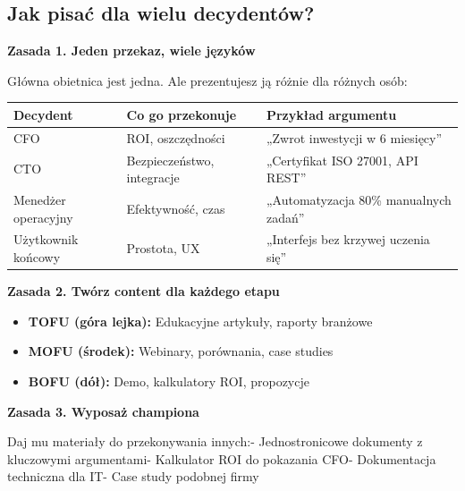 \documentclass[
  12pt,
  a4paper,
  twoside,
  openright,
  12pt,
  DIV=12,
  BCOR=12mm]{scrbook}
\providecommand{\tightlist}{%
  \setlength{\itemsep}{0pt}\setlength{\parskip}{0pt}}\usepackage{longtable,booktabs,array}
\begin{document}
\subsection{Jak pisać dla wielu
decydentów?}\label{jak-pisaux107-dla-wielu-decydentuxf3w}

\textbf{Zasada 1. Jeden przekaz, wiele języków}

Główna obietnica jest jedna. Ale prezentujesz ją różnie dla różnych
osób:

\begin{longtable}[]{@{}
  >{\raggedright\arraybackslash}p{}
  >{\raggedright\arraybackslash}p{}
  >{\raggedright\arraybackslash}p{}@{}}
\toprule\noalign{}
\begin{minipage}[b]{\linewidth}\raggedright
Decydent
\end{minipage} & \begin{minipage}[b]{\linewidth}\raggedright
Co go przekonuje
\end{minipage} & \begin{minipage}[b]{\linewidth}\raggedright
Przykład argumentu
\end{minipage} \\
\midrule\noalign{}
\endhead
\bottomrule\noalign{}
\endlastfoot
CFO & ROI, oszczędności & „Zwrot inwestycji w 6 miesięcy'' \\
CTO & Bezpieczeństwo, integracje & „Certyfikat ISO 27001, API REST'' \\
Menedżer operacyjny & Efektywność, czas & „Automatyzacja 80\% manualnych
zadań'' \\
Użytkownik końcowy & Prostota, UX & „Interfejs bez krzywej uczenia
się'' \\
\end{longtable}

\textbf{Zasada 2. Twórz content dla każdego etapu}

\begin{itemize}
\tightlist
\item
  \textbf{TOFU (góra lejka):} Edukacyjne artykuły, raporty branżowe
\item
  \textbf{MOFU (środek):} Webinary, porównania, case studies
\item
  \textbf{BOFU (dół):} Demo, kalkulatory ROI, propozycje
\end{itemize}

\textbf{Zasada 3. Wyposaż championa}

Daj mu materiały do przekonywania innych:\newline - Jednostronicowe
dokumenty z kluczowymi argumentami\newline - Kalkulator ROI do pokazania
CFO\newline - Dokumentacja techniczna dla IT\newline - Case study
podobnej firmy
\end{document}

